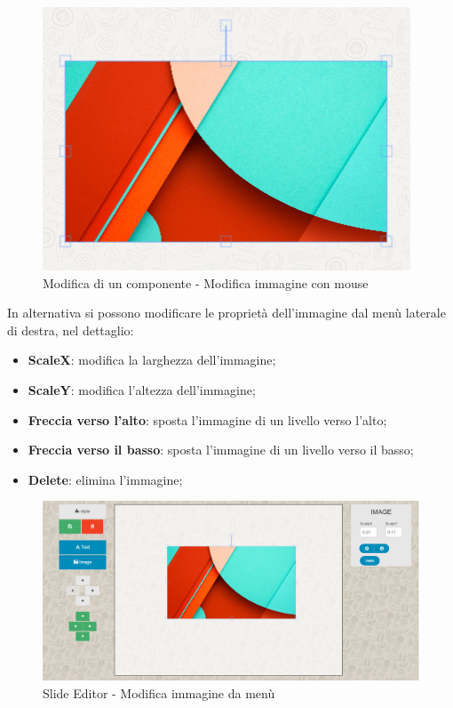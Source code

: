 \begin{figure}[H] 
	\centering 
	\includegraphics[scale=0.80] {img/img_anchor.png}
	\caption{Modifica di un componente - Modifica immagine con mouse} 
\end{figure}

\noindent In alternativa si possono modificare le proprietà dell'immagine dal menù laterale di destra, nel dettaglio:

		\begin{itemize}
			\item \textbf{ScaleX}: modifica la larghezza dell'immagine;
			\item \textbf{ScaleY}: modifica l'altezza dell'immagine;
			\item \textbf{Freccia verso l'alto}: sposta l'immagine di un livello verso l'alto;
			\item \textbf{Freccia verso il basso}: sposta l'immagine di un livello verso il basso;
			\item \textbf{Delete}: elimina l'immagine;
		\end{itemize}
		
\begin{figure}[H] 
	\centering 
	\includegraphics[scale=0.40] {img/img_edit.png}
	\caption{Slide Editor - Modifica immagine da menù} 
\end{figure}	


